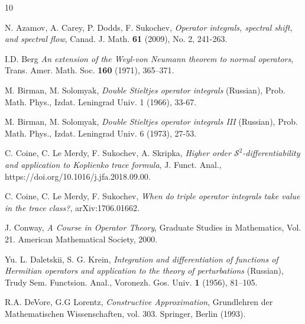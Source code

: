 \documentclass[12pt]{amsart}
\theoremstyle{remark}
\def\Sc{{\mathcal{S}}}
\begin{document}
\begin{thebibliography}{10}




 N. Azamov, A. Carey, P. Dodds, F. Sukochev,
{\it Operator integrals, spectral shift, and spectral flow},
Canad. J. Math. {\bf 61} (2009), No. 2, 241-263.


 I.D. Berg
{\it An extension of the Weyl-von Neumann theorem to normal operators},
Trans. Amer. Math. Soc. {\bf 160} (1971), 365–371.


 M. Birman, M. Solomyak, {\it Double Stieltjes operator integrals}
(Russian), Prob. Math. Phys., Izdat. Leningrad Univ. 1 (1966), 33-67.


 M. Birman, M. Solomyak, {\it Double Stieltjes operator integrals III}
(Russian), Prob. Math. Phys., Izdat. Leningrad Univ. 6 (1973), 27-53.


 C. Coine, C. Le Merdy, F. Sukochev, A. Skripka,
{\it Higher order $\Sc^2$-differentiability and application to Koplienko trace formula}, J. Funct. Anal., https://doi.org/10.1016/j.jfa.2018.09.00.


 C. Coine, C. Le Merdy, F. Sukochev,
{\it When do triple operator integrals take value in the trace class?}, arXiv:1706.01662.


 J. Conway, {\it A Course in Operator Theory},
Graduate Studies in Mathematics, Vol. 21. American Mathematical Society, 2000.


 Yu. L. Daletskii, S. G. Krein, {\it Integration and
differentiation of functions of Hermitian operators and
application to the theory of perturbations} (Russian), Trudy Sem.
Functsion. Anal., Voronezh. Gos. Univ. \textbf{1} (1956), 81--105.

 R.A. DeVore, G.G Lorentz, {\it Constructive Approximation}, Grundlehren der Mathematischen Wissenschaften, vol. 303. Springer, Berlin (1993).



\end{thebibliography}
\end{document}
